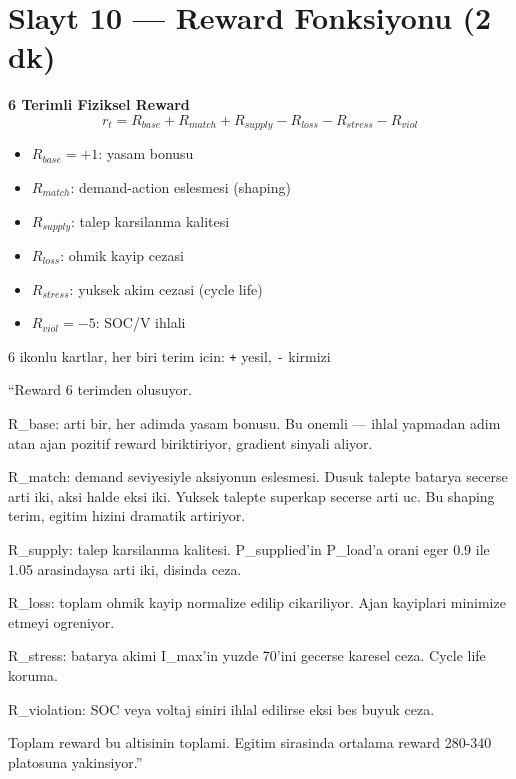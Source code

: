 \documentclass[11pt,a4paper]{article}
\begin{document}
\section{Slayt 10 --- Reward Fonksiyonu (2 dk)}

\begin{slytboks}
\textbf{6 Terimli Fiziksel Reward}
\[ r_t = R_{base} + R_{match} + R_{supply} - R_{loss} - R_{stress} - R_{viol} \]
\begin{itemize}
\item $R_{base} = +1$: yasam bonusu
\item $R_{match}$: demand-action eslesmesi (shaping)
\item $R_{supply}$: talep karsilanma kalitesi
\item $R_{loss}$: ohmik kayip cezasi
\item $R_{stress}$: yuksek akim cezasi (cycle life)
\item $R_{viol} = -5$: SOC/V ihlali
\end{itemize}
\end{slytboks}

\begin{gorselboks}
6 ikonlu kartlar, her biri terim icin: \texttt{+} yesil, \texttt{-} kirmizi
\end{gorselboks}

\begin{sayboks}
``Reward 6 terimden olusuyor.

R\_base: arti bir, her adimda yasam bonusu. Bu onemli --- ihlal yapmadan adim atan ajan pozitif reward biriktiriyor, gradient sinyali aliyor.

R\_match: demand seviyesiyle aksiyonun eslesmesi. Dusuk talepte batarya secerse arti iki, aksi halde eksi iki. Yuksek talepte superkap secerse arti uc. Bu shaping terim, egitim hizini dramatik artiriyor.

R\_supply: talep karsilanma kalitesi. P\_supplied'in P\_load'a orani eger 0.9 ile 1.05 arasindaysa arti iki, disinda ceza.

R\_loss: toplam ohmik kayip normalize edilip cikariliyor. Ajan kayiplari minimize etmeyi ogreniyor.

R\_stress: batarya akimi I\_max'in yuzde 70'ini gecerse karesel ceza. Cycle life koruma.

R\_violation: SOC veya voltaj siniri ihlal edilirse eksi bes buyuk ceza.

Toplam reward bu altisinin toplami. Egitim sirasinda ortalama reward 280-340 platosuna yakinsiyor.''
\end{sayboks}
\end{document}
